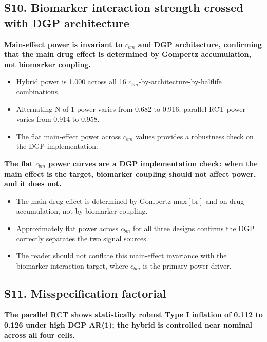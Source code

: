 \documentclass[
  11pt,
]{article}
\begin{document}
\subsection{S10. Biomarker interaction strength crossed with DGP architecture}\label{s10.-biomarker-interaction-strength-crossed-with-dgp-architecture}

\textbf{Main-effect power is invariant to $c_{bm}$ and DGP architecture, confirming that the main drug effect is determined by Gompertz accumulation, not biomarker coupling.}

\begin{itemize}\setlength{\itemsep}{2pt}\setlength{\parskip}{0pt}
\item Hybrid power is 1.000 across all 16 $c_{bm}$-by-architecture-by-halflife combinations.
\item Alternating N-of-1 power varies from 0.682 to 0.916; parallel RCT power varies from 0.914 to 0.958.
\item The flat main-effect power across $c_{bm}$ values provides a robustness check on the DGP implementation.
\end{itemize}

\textbf{The flat $c_{bm}$ power curves are a DGP implementation check: when the main effect is the target, biomarker coupling should not affect power, and it does not.}

\begin{itemize}\setlength{\itemsep}{2pt}\setlength{\parskip}{0pt}
\item The main drug effect is determined by Gompertz $\mathrm{max}[\mathrm{br}]$ and on-drug accumulation, not by biomarker coupling.
\item Approximately flat power across $c_{bm}$ for all three designs confirms the DGP correctly separates the two signal sources.
\item The reader should not conflate this main-effect invariance with the biomarker-interaction target, where $c_{bm}$ is the primary power driver.
\end{itemize}

\subsection{S11. Misspecification factorial}\label{s11.-misspecification-factorial}

\textbf{The parallel RCT shows statistically robust Type I inflation of 0.112 to 0.126 under high DGP AR(1); the hybrid is controlled near nominal across all four cells.}
\end{document}
